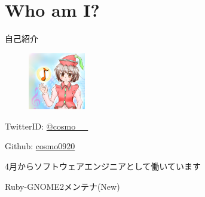\section{Who am I?}

\begin{frame}
\begin{block}{自己紹介}
{\Large
\begin{figure}
\begin{center}
\includegraphics[width=2.5cm]{img/icon.png}
\end{center}
\end{figure}

TwitterID: \href{https://twitter.com/cosmo\_\_}{@cosmo\_\_ }

Github: \href{https://github.com/cosmo0920}{cosmo0920 }

4月からソフトウェアエンジニアとして働いています

Ruby-GNOME2メンテナ(New)

}
\end{block}
\end{frame}
